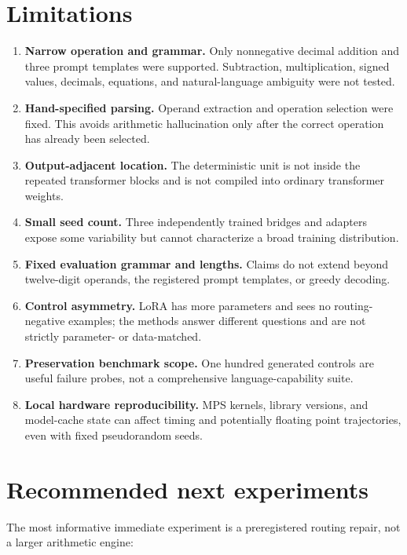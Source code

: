 \documentclass[11pt]{article}
\begin{document}
\section{Limitations}

\begin{enumerate}
  \item \textbf{Narrow operation and grammar.} Only nonnegative decimal
  addition and three prompt templates were supported. Subtraction,
  multiplication, signed values, decimals, equations, and natural-language
  ambiguity were not tested.
  \item \textbf{Hand-specified parsing.} Operand extraction and operation
  selection were fixed. This avoids arithmetic hallucination only after the
  correct operation has already been selected.
  \item \textbf{Output-adjacent location.} The deterministic unit is not
  inside the repeated transformer blocks and is not compiled into ordinary
  transformer weights.
  \item \textbf{Small seed count.} Three independently trained bridges and
  adapters expose some variability but cannot characterize a broad training
  distribution.
  \item \textbf{Fixed evaluation grammar and lengths.} Claims do not extend
  beyond twelve-digit operands, the registered prompt templates, or greedy
  decoding.
  \item \textbf{Control asymmetry.} LoRA has more parameters and sees no
  routing-negative examples; the methods answer different questions and are
  not strictly parameter- or data-matched.
  \item \textbf{Preservation benchmark scope.} One hundred generated controls
  are useful failure probes, not a comprehensive language-capability suite.
  \item \textbf{Local hardware reproducibility.} MPS kernels, library
  versions, and model-cache state can affect timing and potentially floating
  point trajectories, even with fixed pseudorandom seeds.
\end{enumerate}

\section{Recommended next experiments}

The most informative immediate experiment is a preregistered routing repair,
not a larger arithmetic engine:
\end{document}

